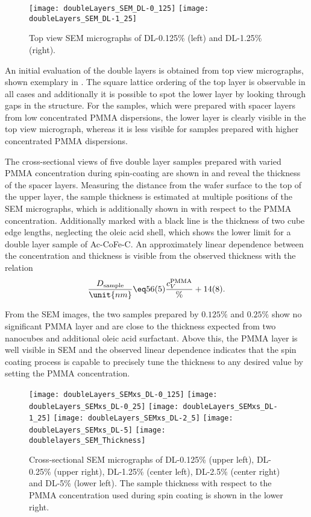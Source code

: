 \documentclass[\main/dresen_thesis.tex]{subfiles}
\begin{document}
  \label{sec:doublelayers:layers:sem}

  \begin{figure}[tb]
    \centering
    \texttt{[image: doubleLayers\_SEM\_DL-0\_125]}
    \texttt{[image: doubleLayers\_SEM\_DL-1\_25]}
    \caption{\label{fig:doublelayers:layers:sem}Top view SEM micrographs of DL-0.125\% (left) and DL-1.25\% (right).}
  \end{figure}

  An initial evaluation of the double layers is obtained from top view micrographs, shown exemplary in .
  The square lattice ordering of the top layer is observable in all cases and additionally it is possible to spot the lower layer by looking through gaps in the structure.
  For the samples, which were prepared with spacer layers from low concentrated PMMA dispersions, the lower layer is clearly visible in the top view micrograph, whereas it is less visible for samples prepared with higher concentrated PMMA dispersions.

  The cross-sectional views of five double layer samples prepared with varied PMMA concentration during spin-coating are shown in  and reveal the thickness of the spacer layers.
  Measuring the distance from the wafer surface to the top of the upper layer, the sample thickness is estimated at multiple positions of the SEM micrographs, which is additionally shown in  with respect to the PMMA concentration.
  Additionally marked with a black line is the thickness of two cube edge lengths, neglecting the oleic acid shell, which shows the lower limit for a double layer sample of Ac-CoFe-C.
  An approximately linear dependence between the concentration and thickness is visible from the observed thickness with the relation
  \begin{align}
    \frac{D_\mathrm{sample}}{\unit{nm}} \eq 56(5) \frac{c_V^\mathrm{PMMA}}{\%}  + 14(8).
  \end{align}

  From the SEM images, the two samples prepared by $0.125 \%$ and $0.25\%$ show no significant PMMA layer and are close to the thickness expected from two nanocubes and additional oleic acid surfactant.
  Above this, the PMMA layer is well visible in SEM and the observed linear dependence indicates that the spin coating process is capable to precisely tune the thickness to any desired value by setting the PMMA concentration.

  \begin{figure}[tb]
    \centering
    \texttt{[image: doubleLayers\_SEMxs\_DL-0\_125]}
    \texttt{[image: doubleLayers\_SEMxs\_DL-0\_25]}
    \texttt{[image: doubleLayers\_SEMxs\_DL-1\_25]}
    \texttt{[image: doubleLayers\_SEMxs\_DL-2\_5]}
    \texttt{[image: doubleLayers\_SEMxs\_DL-5]}
    \texttt{[image: doublelayers\_SEM\_Thickness]}
    \caption{\label{fig:doublelayers:layers:xs}Cross-sectional SEM micrographs of DL-0.125\% (upper left), DL-0.25\% (upper right), DL-1.25\% (center left), DL-2.5\% (center right) and DL-5\% (lower left). The sample thickness with respect to the PMMA concentration used during spin coating is shown in the lower right. }
  \end{figure}
\end{document}
